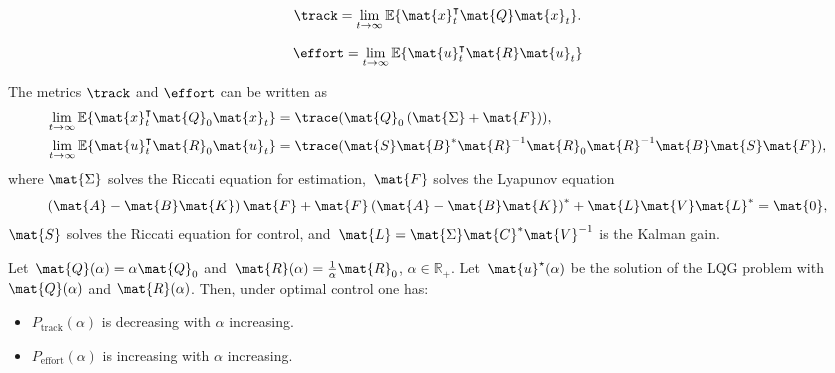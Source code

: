 {\begin{forslides}
		\begin{equation*}
			\label{eq:ptrack}
			\track=\lim_{t\to \infty}\mathbb{E}\{\mat{x}_t^\intercal \mat{Q}\mat{x}_t\}.
		\end{equation*}

		\begin{equation*}
			\label{eq:peffort}
			\effort=\lim_{t\to \infty}\mathbb{E}\{\mat{u}_t^\intercal \mat{R} \mat{u}_t \}
		\end{equation*}

		\begin{lemma}
			\label{lem:precision}
			The metrics $\track$ and $\effort$ can be written as
			\begin{equation*}
				\begin{aligned}
					\lim_{t\to \infty}\mathbb{E}\{ \mat{x}_t^\intercal \mat{Q}_0\mat{x}_t\} & =\trace(\mat{Q}_0\left( \mat{\Sigma} +\mat{F}\right)),                           \\
					\lim_{t\to \infty}\mathbb{E}\{ \mat{u}_t^\intercal \mat{R}_0\mat{u}_t\} & =\trace(\mat{S}\mat{B}^*\mat{R}^{-1}\mat{R}_0\mat{R}^{-1}\mat{B}\mat{S}\mat{F}),
				\end{aligned}
			\end{equation*}
			where
			$\mat{\Sigma}$ solves the Riccati equation for estimation,~$\mat{F}$ solves the Lyapunov equation
			\begin{equation}
				\label{eq:lyapct}
				\left( \mat{A}-\mat{B}\mat{K}\right)\mat{F}+\mat{F}\left(\mat{A}-\mat{B}\mat{K}\right)^*+\mat{L}\mat{V}\mat{L}^*=\mat{0},
			\end{equation}
			$\mat{S}$ solves the Riccati equation for control, and~$\mat{L}=\mat{\Sigma}\mat{C}^*\mat{V}^{-1}$ is the Kalman gain.
		\end{lemma}

		\begin{lemma}
			\label{lem:codesigncnt_1}
			Let~$\mat{Q}(\alpha)=\alpha \mat{Q}_0$ and~$\mat{R}(\alpha)=\frac{1}{\alpha}\mat{R}_0$, $\alpha\in \mathbb{R}_+$.
			Let~$\mat{u}^\star(\alpha)$ be the solution of the LQG problem with $\mat{Q}(\alpha)$ and $\mat{R}(\alpha)$.
			Then, under optimal control one has:
			\begin{itemize}
				\item $P_\mathrm{track}(\alpha)$ is decreasing with $\alpha$
				      increasing.
				\item $P_\mathrm{effort}(\alpha)$ is increasing with $\alpha$ increasing.
			\end{itemize}
		\end{lemma}


\end{forslides}}
